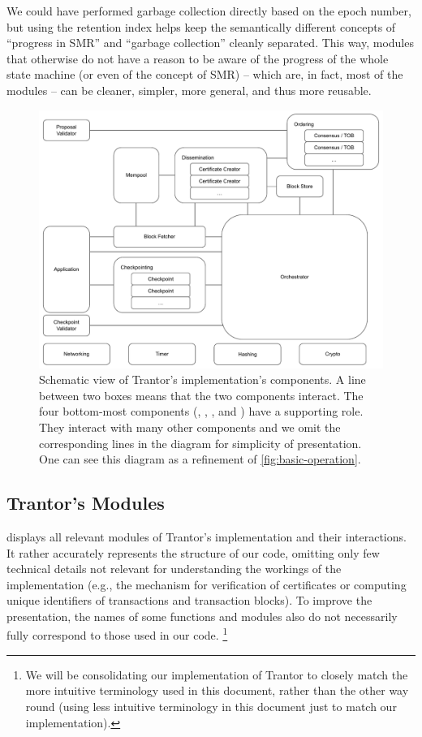 \documentclass{article}
\begin{document}
We could have performed garbage collection directly based on the epoch number,
but using the retention index helps keep the semantically different concepts of ``progress in SMR'' and ``garbage collection'' cleanly separated.
This way, modules that otherwise do not have a reason to be aware of the progress of the whole state machine (or even of the concept of SMR)
-- which are, in fact, most of the modules --
can be cleaner, simpler, more general, and thus more reusable.

\begin{figure}[ht]
    \centering
    \includegraphics[width=\textwidth]{figures/implementation-diagram}
    \caption{Schematic view of Trantor's implementation's components.
    A line between two boxes means that the two components interact.
    The four bottom-most components (, , , and ) have a supporting role.
    They interact with many other components and we omit the corresponding lines in the diagram for simplicity of presentation.
    One can see this diagram as a refinement of \cref{fig:basic-operation}.
    }
    \label{fig:implementation-diagram}
\end{figure}

\subsection{Trantor's Modules}
\label{sec:trantor-modules}

 displays all relevant modules of Trantor's implementation and their interactions.
It rather accurately represents the structure of our code, omitting only few technical details not relevant for understanding the workings of the implementation
(e.g., the mechanism for verification of certificates or computing unique identifiers of transactions and transaction blocks).
To improve the presentation, the names of some functions and modules also do not necessarily fully correspond to those used in our code.%
\footnote{We will be consolidating our implementation of Trantor to closely match the more intuitive terminology used in this document,
rather than the other way round (using less intuitive terminology in this document just to match our implementation).}
\end{document}
